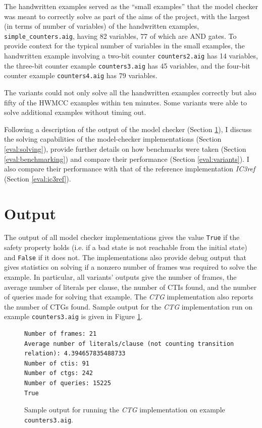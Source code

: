 \documentclass[12pt,a4paper,twoside,openright]{report}
\begin{document}
{The handwritten examples served as the ``small examples'' that the model checker
was meant to correctly solve as part of the aims of the project, with the largest
(in terms of number of variables) of the handwritten examples,
\verb,simple_counters.aig,, having 82 variables, 77 of which are AND gates.
To provide context for the
typical number of variables in the small examples, the handwritten example involving a
two-bit counter \verb,counters2.aig, has 14 variables, the three-bit counter example
\verb,counters3.aig, has 45 variables, and the four-bit counter example
\verb,counters4.aig, has 79 variables.

The variants could not only solve all the handwritten examples correctly
but also fifty of the HWMCC examples within ten minutes. Some
variants were able to solve additional examples without timing out.

Following a description of the output of the model checker (Section \ref{eval:output}),
I discuss the solving capabilities of the model-checker implementations (Section
\ref{eval:solving}), provide further details on how benchmarks were taken
(Section \ref{eval:benchmarking}) and compare
their performance (Section \ref{eval:variants}).
I also compare their performance with that of the reference implementation
\emph{IC3ref} (Section \ref{eval:ic3ref}).

\section{Output}
\label{eval:output}

The output of all model checker implementations gives the value \verb,True, if the safety
property holds (i.e. if a bad state is not reachable from the initial state) and
\verb,False, if it does not. The implementations also provide debug output that gives
statistics on solving if a nonzero number of frames was required to solve the example.
In particular, all variants' outputs give the number of frames, the average number of
literals per clause, the number of CTIs found, and the number of queries made for solving
that example. The {\it CTG} implementation also reports the number of CTGs found. Sample output
for the {\it CTG} implementation run on example \verb,counters3.aig,
is given in Figure \ref{sampleoutput}.

\begin{figure}[t]
\centering
\begin{lstlisting}[keywordstyle = \ttfamily, basicstyle = \footnotesize\ttfamily]
Number of frames: 21
Average number of literals/clause (not counting transition relation): 4.394657835488733
Number of ctis: 91
Number of ctgs: 242
Number of queries: 15225
True
\end{lstlisting}
\caption{Sample output for running the {\it CTG} implementation on example {\tt counters3.aig}.}
\label{sampleoutput}
\end{figure}

}
\end{document}
